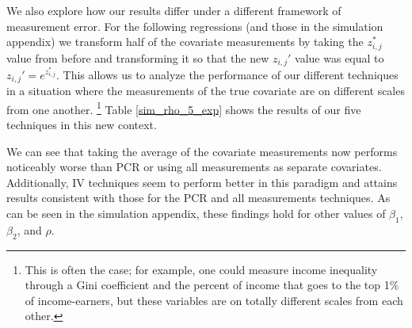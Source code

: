 \documentclass[10pt]{article}
\begin{document}
We also explore how our results differ under a different framework of measurement error. For the following regressions (and those in the simulation appendix) we transform half of the covariate measurements by taking the $z_{i,j}^*$ value from before and transforming it so that the new $z_{i,j}'$ value was equal to $z_{i,j}' = e^{z_{i,j}^*}$. This allows us to analyze the performance of our different techniques in a situation where the measurements of the true covariate are on different scales from one another. \footnote{This is often the case; for example, one could measure income inequality through a Gini coefficient and the percent of income that goes to the top 1\% of income-earners, but these variables are on totally different scales from each other.} Table \ref{sim_rho_5_exp} shows the results of our five techniques in this new context.

\begin{table}[!htbp] \centering
    \caption{Average Coefficients for Values of $\rho$ (Half of Measurements are Transformed) \label{sim_rho_5_exp}}
  \end{table}


We can see that taking the average of the covariate measurements now performs noticeably worse than PCR or using all measurements as separate covariates. Additionally, IV techniques seem to perform better in this paradigm and attains results consistent with those for the PCR and all measurements techniques. As can be seen in the simulation appendix, these findings hold for other values of $\beta_1$, $\beta_2$, and $\rho$.
\end{document}
